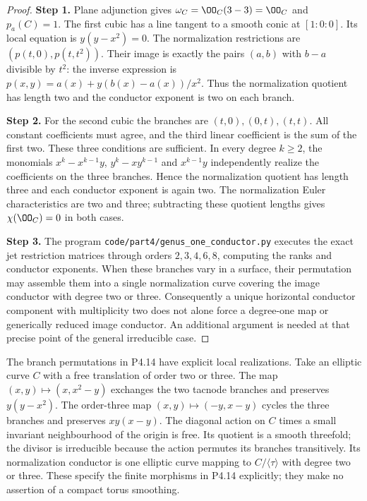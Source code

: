 \begin{proof}
\noindent\textbf{Step 1.} Plane adjunction gives $\omega_C=\OO_C(3-3)=\OO_C$ and
$p_a(C)=1$. The first cubic has a line tangent to a smooth
conic at $[1:0:0]$. Its local equation is $y(y-x^2)=0$.
The normalization restrictions are $(p(t,0),p(t,t^2))$.
Their image is exactly the pairs $(a,b)$ with $b-a$ divisible
by $t^2$: the inverse expression is
$p(x,y)=a(x)+y(b(x)-a(x))/x^2$. Thus the normalization
quotient has length two and the conductor exponent is two on
each branch.

\noindent\textbf{Step 2.} For the second cubic the branches are $(t,0),(0,t),(t,t)$.
All constant coefficients must agree, and the third linear
coefficient is the sum of the first two. These three conditions
are sufficient. In every degree $k\ge2$, the monomials
$x^k-x^{k-1}y$, $y^k-xy^{k-1}$ and $x^{k-1}y$ independently
realize the coefficients on the three branches. Hence the
normalization quotient has length three and each conductor
exponent is again two. The normalization Euler characteristics
are two and three; subtracting these quotient lengths gives
$\chi(\OO_C)=0$ in both cases.

\noindent\textbf{Step 3.} The program \texttt{code/part4/genus\_one\_conductor.py}
executes the exact jet restriction matrices through orders
$2,3,4,6,8$, computing the ranks and conductor exponents.
When these branches vary in a surface, their permutation may
assemble them into a single normalization curve covering the
image conductor with degree two or three. Consequently a
unique horizontal conductor component with multiplicity two
does not alone force a degree-one map or generically reduced
image conductor. An additional argument is needed at that
precise point of the general irreducible case.
\end{proof}

The branch permutations in P4.14 have explicit local realizations.
Take an elliptic curve $C$ with a free translation of order two or
three. The map $(x,y)\mapsto(x,x^2-y)$ exchanges the two tacnode
branches and preserves $y(y-x^2)$. The order-three map
$(x,y)\mapsto(-y,x-y)$ cycles the three branches and preserves
$xy(x-y)$. The diagonal action on $C$ times a small invariant
neighbourhood of the origin is free. Its quotient is a smooth
threefold; the divisor is irreducible because the action permutes
its branches transitively. Its normalization conductor is one
elliptic curve mapping to $C/\langle\tau\rangle$ with degree two
or three. These specify the finite morphisms in P4.14 explicitly;
they make no assertion of a compact torus smoothing.

